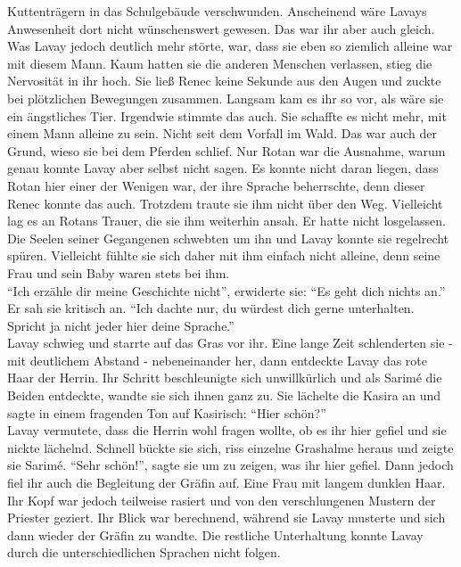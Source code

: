 Kuttenträgern in das Schulgebäude verschwunden. Anscheinend wäre Lavays Anwesenheit dort nicht 
wünschenswert gewesen. Das war ihr aber auch gleich. Was Lavay jedoch deutlich mehr störte, war, 
dass sie eben so ziemlich alleine war mit diesem Mann. Kaum hatten sie die anderen Menschen 
verlassen, stieg die Nervosität in ihr hoch. Sie ließ Renec keine Sekunde aus den Augen und zuckte 
bei plötzlichen Bewegungen zusammen. Langsam kam es ihr so vor, als wäre sie ein ängstliches Tier. 
Irgendwie stimmte das auch. Sie schaffte es nicht mehr, mit einem Mann alleine zu sein. Nicht seit 
dem Vorfall im Wald. Das war auch der Grund, wieso sie bei dem Pferden schlief. Nur Rotan war die 
Ausnahme, warum genau konnte Lavay aber selbst nicht sagen. Es konnte nicht daran liegen, dass 
Rotan hier einer der Wenigen war, der ihre Sprache beherrschte, denn dieser Renec konnte das auch. 
Trotzdem traute sie ihm nicht über den Weg. Vielleicht lag es an Rotans Trauer, die sie ihm 
weiterhin ansah. Er hatte nicht losgelassen. Die Seelen seiner Gegangenen schwebten um ihn und 
Lavay konnte sie regelrecht spüren. Vielleicht fühlte sie sich daher mit ihm einfach nicht alleine, 
denn seine Frau und sein Baby waren stets bei ihm.\\
``Ich erzähle dir meine Geschichte nicht'', erwiderte sie: ``Es geht dich nichts an.''\\
Er sah sie kritisch an. ``Ich dachte nur, du würdest dich gerne unterhalten. Spricht ja nicht jeder 
hier deine Sprache.''\\
Lavay schwieg und starrte auf das Gras vor ihr. Eine lange Zeit schlenderten sie - mit deutlichem 
Abstand - nebeneinander her, dann entdeckte Lavay das rote Haar der Herrin. Ihr Schritt 
beschleunigte sich unwillkürlich und als Sarimé die Beiden entdeckte, wandte sie sich ihnen ganz 
zu. Sie lächelte die Kasira an und sagte in einem fragenden Ton auf Kasirisch: ``Hier schön?''\\
Lavay vermutete, dass die Herrin wohl fragen wollte, ob es ihr hier gefiel und sie nickte lächelnd. 
Schnell bückte sie sich, riss einzelne Grashalme heraus und zeigte sie Sarimé. ``Sehr schön!'', 
sagte sie um zu zeigen, was ihr hier gefiel. Dann jedoch fiel ihr auch die Begleitung der Gräfin 
auf. Eine Frau mit langem dunklen Haar. Ihr Kopf war jedoch teilweise rasiert und von den 
verschlungenen Mustern der Priester geziert. Ihr Blick war berechnend, während sie Lavay musterte 
und sich dann wieder der Gräfin zu wandte. Die restliche Unterhaltung konnte Lavay durch die 
unterschiedlichen Sprachen nicht folgen.\\

